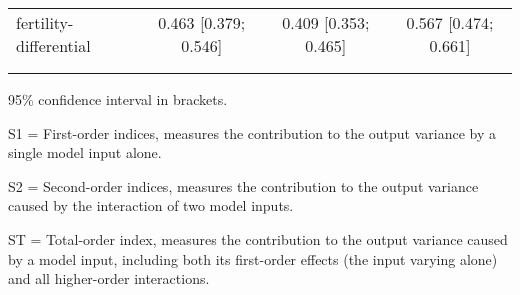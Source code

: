 \begin{table}[htp]
\begin{threeparttable}
\begin{tabular}{lccc}
	  \hspace{1.5em} fertility-differential & 0.463 [0.379; 0.546]   & 0.409 [0.353; 0.465]   & 0.567 [0.474; 0.661] \\
	 \\
    \addlinespace
    \hline
    \end{tabular}
    \begin{tablenotes}
    \scriptsize
    \item 95\% confidence interval in brackets.
    \item S1 = First-order indices,  measures the contribution to the output variance by a single model input alone.
    \item S2 = Second-order indices,  measures the contribution to the output variance caused by the interaction of two model inputs.
    \item ST = Total-order index, measures the contribution to the output variance caused by a model input, including both its first-order effects (the input varying alone) and all higher-order interactions.
    \end{tablenotes}
    \end{threeparttable}
    \end{table}